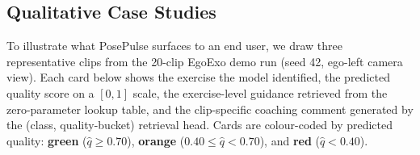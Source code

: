 \documentclass[conference,onecolumn,oneside]{IEEEtran}
\begin{document}
\subsection{Qualitative Case Studies}
\label{sec:sample_output}

To illustrate what PosePulse surfaces to an end user, we draw three
representative clips from the 20-clip EgoExo demo run (seed 42, ego-left
camera view). Each card below shows the exercise the model identified,
the predicted quality score on a $[0,1]$ scale, the exercise-level
guidance retrieved from the zero-parameter lookup table, and the
clip-specific coaching comment generated by the (class, quality-bucket)
retrieval head. Cards are colour-coded by predicted quality:
\textcolor{green!60!black}{\textbf{green}} ($\hat{q} \geq 0.70$),
\textcolor{orange!80!black}{\textbf{orange}} ($0.40 \leq \hat{q} < 0.70$),
and \textcolor{red!70!black}{\textbf{red}} ($\hat{q} < 0.40$).
\end{document}
